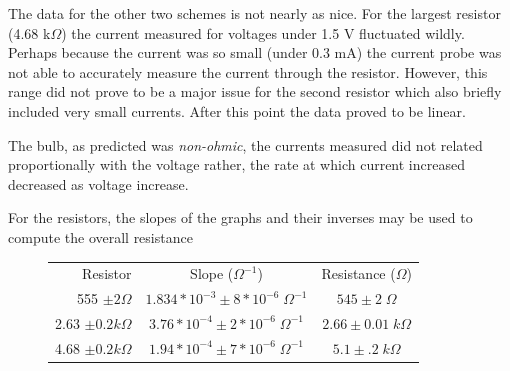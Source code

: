 \documentclass[11pt]{article}
\begin{document}
The data for the other two schemes is not nearly as nice. For the largest resistor (4.68 k\( \Omega\)) the current measured for voltages under 1.5 V fluctuated wildly. Perhaps because the current was so small (under 0.3 mA) the current probe was not able to accurately measure the current through the resistor. However, this range did not prove to be a major issue for the second resistor which also briefly included very small currents. After this point the data proved to be linear.

The bulb, as predicted was \textit{non-ohmic}, the currents measured did not related proportionally with the voltage rather, the rate at which current increased decreased as voltage increase.

For the resistors, the slopes of the graphs and their inverses may be used to compute the overall resistance
\begin{figure}[h]
	\centering
\begin{tabular}{r|c|c}
	Resistor & Slope (\( \Omega^{-1} \)) & Resistance (\( \Omega \)) \\
	555 \( \pm 2 \Omega \) & \(1.834 * 10^{-3} \pm 8 * 10^{-6} \; \Omega^{-1} \)&   \( 545 \pm 2 \; \Omega \)  \\
	2.63 \( \pm 0.2 k\Omega \) &  \(3.76 * 10^{-4} \pm 2 * 10^{-6} \; \Omega^{-1} \) & \( 2.66 \pm 0.01 \; k\Omega \)  \\
	4.68 \( \pm 0.2 k\Omega \) &  \(1.94 * 10^{-4} \pm 7 * 10^{-6} \; \Omega^{-1} \) & \( 5.1 \pm .2 \; k\Omega \)
\end{tabular}
\end{figure}
\end{document}
